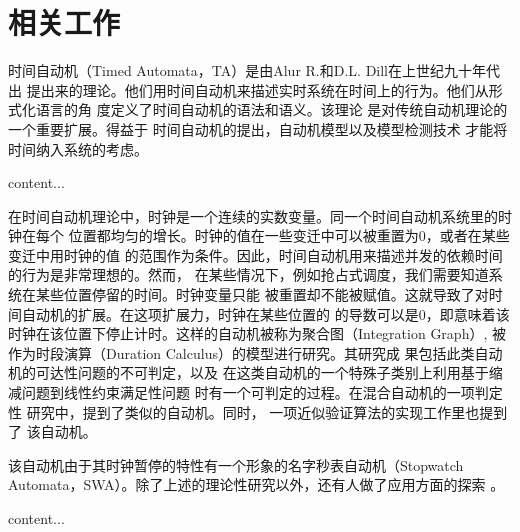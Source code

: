 
\chapter{相关工作}
\label{cha:related_work}


时间自动机（Timed Automata，TA）是由Alur R.和D.L. Dill在上世纪九十年代出
提出来的理论。他们用时间自动机来描述实时系统在时间上的行为。他们从形式化语言的角
度定义了时间自动机的语法和语义\cite{Alur:1994:TTA:180782.180519}。该理论
是对传统自动机理论\cite{Hopcroft:2006:IAT:1196416}的一个重要扩展。得益于
时间自动机的提出，自动机模型以及模型检测技术\cite{Clarke:2000:MC:332656}
才能将时间纳入系统的考虑。

\begin{definition}
content...
\end{definition}

在时间自动机理论中，时钟是一个连续的实数变量。同一个时间自动机系统里的时钟在每个
位置都均匀的增长。时钟的值在一些变迁中可以被重置为0，或者在某些变迁中用时钟的值
的范围作为条件。因此，时间自动机用来描述并发的依赖时间的行为是非常理想的。然而，
在某些情况下，例如抢占式调度，我们需要知道系统在某些位置停留的时间。时钟变量只能
被重置却不能被赋值。这就导致了对时间自动机的扩展。在这项扩展力，时钟在某些位置的
的导数可以是0，即意味着该时钟在该位置下停止计时。这样的自动机被称为聚合图（Integration
Graph）\cite{Kesten:1999:DIG:302392.302397}, 被作为时段演算（Duration 
Calculus）\cite{DBLP:journals/ipl/ChaochenHR91}的模型进行研究。其研究成
果包括此类自动机的可达性问题的不可判定\cite{Alur04decisionproblems}，以及
在这类自动机的一个特殊子类别上利用基于缩减问题到线性约束满足性问题\cite{Apt:2003:PCP:1237975}
时有一个可判定的过程。在混合自动机\cite{Henzinger96thetheory}的一项判定性
研究\cite{McManis:1994:SAD:647763.735660}中，提到了类似的自动机。同时，
一项近似验证算法的实现工作\cite{Cassez:2000:IPS:646735.701625}里也提到了
该自动机。

该自动机由于其时钟暂停的特性有一个形象的名字\pozhehao 秒表自动机（Stopwatch
Automata，SWA）。除了上述的理论性研究以外，还有人做了应用方面的探索
\cite{Abdeddaim:2002:PJS:646486.694487}。

\begin{definition}
content...
\end{definition}


